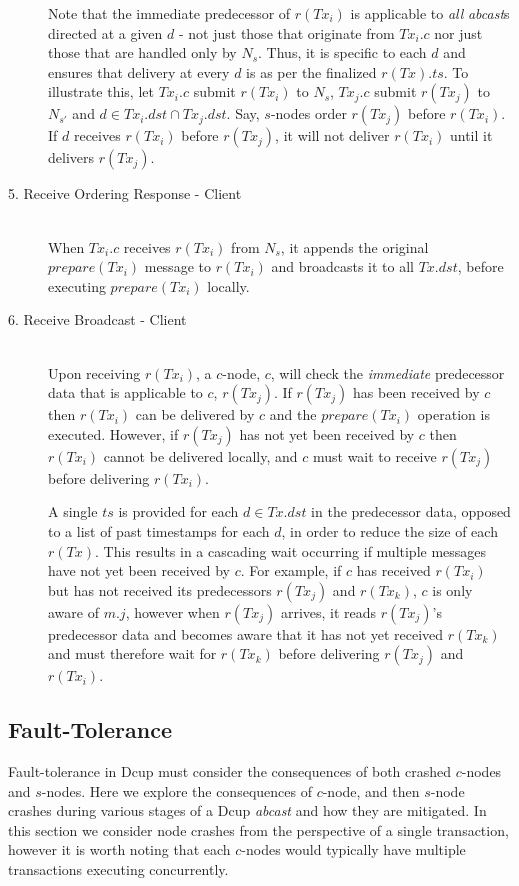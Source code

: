 \begin{description}
		Note that the immediate predecessor of $r(Tx_i)$ is applicable to \emph{all} \emph{abcast}s directed at a given $d$ - not just those that originate from $Tx_i.c$ nor just those that are handled only by $N_s$. Thus, it is specific to each $d$ and ensures that delivery at every $d$ is as per the finalized $r(Tx).ts$. To illustrate this, let $Tx_i.c$ submit $r(Tx_i)$ to $N_s$, $Tx_j.c$ submit $r(Tx_j)$ to $N_{s'}$ and $d \in Tx_i.dst \cap Tx_j.dst$. Say, $s$-nodes order $r(Tx_j)$ before $r(Tx_i)$. If $d$ receives $r(Tx_i)$ before $r(Tx_j)$, it will not deliver $r(Tx_i)$ until it delivers $r(Tx_j)$.

    \item[5. Receive Ordering Response - Client] \hfill \\
    When $Tx_i.c$ receives $r(Tx_i)$ from $N_s$, it appends the original $prepare(Tx_i)$ message to $r(Tx_i)$ and broadcasts it to all $Tx.dst$, before executing $prepare(Tx_i)$ locally.  
    
    \item[6. Receive Broadcast - Client] \hfill \\
    Upon receiving $r(Tx_i)$, a $c$-node, $c$, will check the \emph{immediate} predecessor data that is applicable to $c$, $r(Tx_j)$.  If $r(Tx_j)$ has been received by $c$ then $r(Tx_i)$ can be delivered by $c$ and the $prepare(Tx_i)$ operation is executed.  However, if $r(Tx_j)$ has not yet been received by $c$ then $r(Tx_i)$ cannot be delivered locally, and $c$ must wait to receive $r(Tx_j)$ before delivering $r(Tx_i)$.  
    
    A single $ts$ is provided for each $d \in Tx.dst$ in the predecessor data, opposed to a list of past timestamps for each $d$, in order to reduce the size of each $r(Tx)$.  This results in a cascading wait occurring if multiple messages have not yet been received by $c$.  For example, if $c$ has received $r(Tx_i)$ but has not received its predecessors $r(Tx_j)$ and $r(Tx_k)$, $c$ is only aware of $m.j$, however when $r(Tx_j)$ arrives, it reads $r(Tx_j)$'s predecessor data and becomes aware that it has not yet received $r(Tx_k)$ and must therefore wait for $r(Tx_k)$ before delivering $r(Tx_j)$ and $r(Tx_i)$.  
    
   	\end{description}

	\subsection{Fault-Tolerance}
	Fault-tolerance in \textsf{Dcup} must consider the consequences of both crashed $c$-nodes and $s$-nodes.  Here we explore the consequences of $c$-node, and then $s$-node crashes during various stages of a \textsf{Dcup} \emph{abcast} and how they are mitigated.  In this section we consider node crashes from the perspective of a single transaction, however it is worth noting that each $c$-nodes would typically have multiple transactions executing concurrently.  
	
